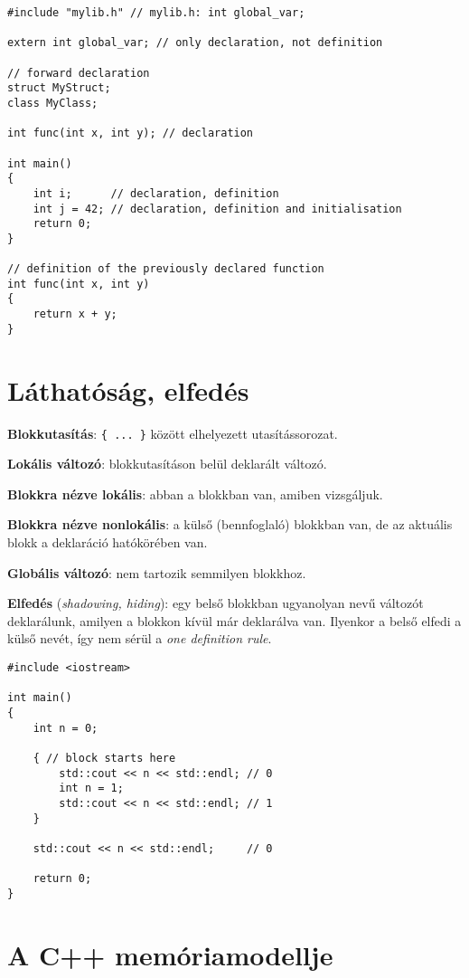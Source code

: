 \documentclass[a4paper, 11pt, oneside]{book}
\begin{document}
\begin{lstlisting}[style=cppstyle, caption={Egy összefoglaló példa deklarációra, definícióra és inicializációra}]
#include "mylib.h" // mylib.h: int global_var;

extern int global_var; // only declaration, not definition

// forward declaration
struct MyStruct;
class MyClass;

int func(int x, int y); // declaration

int main() 
{
	int i; 		// declaration, definition
	int j = 42; // declaration, definition and initialisation
	return 0;
}

// definition of the previously declared function
int func(int x, int y) 
{
	return x + y;
}
\end{lstlisting}

\section{Láthatóság, elfedés}

\textbf{Blokkutasítás}: \verb|{ ... }| között elhelyezett utasítássorozat.

\textbf{Lokális változó}: blokkutasításon belül deklarált változó.

\textbf{Blokkra nézve lokális}: abban a blokkban van, amiben vizsgáljuk.

\textbf{Blokkra nézve nonlokális}: a külső (bennfoglaló) blokkban van, de az aktuális blokk a deklaráció hatókörében van.

\textbf{Globális változó}: nem tartozik semmilyen blokkhoz.

\textbf{Elfedés} (\textit{shadowing, hiding}): egy belső blokkban ugyanolyan nevű változót deklarálunk, amilyen a blokkon kívül már deklarálva van. Ilyenkor a belső elfedi a külső nevét, így nem sérül a \textit{one definition rule}.

\begin{lstlisting}[style=cppstyle]
#include <iostream>

int main()
{
	int n = 0;
	
	{ // block starts here
		std::cout << n << std::endl; // 0
		int n = 1;
		std::cout << n << std::endl; // 1
	}

	std::cout << n << std::endl;	 // 0
	
	return 0;
}
\end{lstlisting}

\section{A C++ memóriamodellje}
\end{document}
